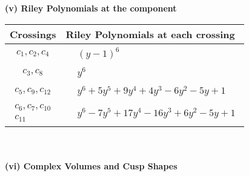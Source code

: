 \documentclass[1p]{elsarticle_modified}
\theoremstyle{definition}
\begin{document}
\newpage\renewcommand{\arraystretch}{1}
\flushleft \textbf{(v) Riley Polynomials at the component}\newline \\
\begin{tabular}{m{50pt}|m{274pt}}
Crossings & \hspace{64pt}Riley Polynomials at each crossing \\
\hline $$\begin{aligned}c_{1},c_{2},c_{4}\end{aligned}$$&$\begin{aligned}
&(y-1)^6
\end{aligned}$\\
\hline $$\begin{aligned}c_{3},c_{8}\end{aligned}$$&$\begin{aligned}
&y^6
\end{aligned}$\\
\hline $$\begin{aligned}c_{5},c_{9},c_{12}\end{aligned}$$&$\begin{aligned}
&y^6+5 y^5+9 y^4+4 y^3-6 y^2-5 y+1
\end{aligned}$\\
\hline $$\begin{aligned}c_{6},c_{7},c_{10}\\c_{11}\end{aligned}$$&$\begin{aligned}
&y^6-7 y^5+17 y^4-16 y^3+6 y^2-5 y+1
\end{aligned}$\\
\hline
\end{tabular}\\~\\
\newpage\flushleft \textbf{(vi) Complex Volumes and Cusp Shapes}
\end{document}
